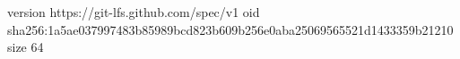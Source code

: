 version https://git-lfs.github.com/spec/v1
oid sha256:1a5ae037997483b85989bcd823b609b256e0aba25069565521d1433359b21210
size 64
